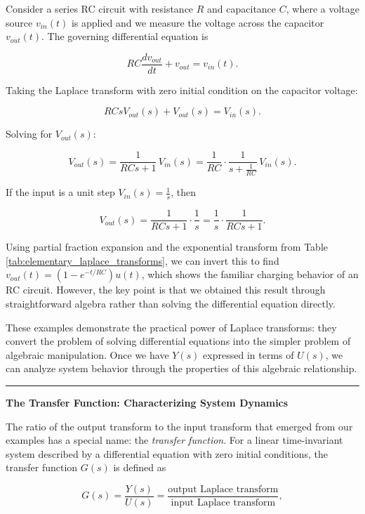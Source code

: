 \begin{example}[RC Circuit]
Consider a series RC circuit with resistance $R$ and capacitance $C$, where a voltage source $v_{in}(t)$ is applied and we measure the voltage across the capacitor $v_{out}(t)$. The governing differential equation is

\[
RC \frac{dv_{out}}{dt} + v_{out} = v_{in}(t).
\]

Taking the Laplace transform with zero initial condition on the capacitor voltage:

\[
RC s V_{out}(s) + V_{out}(s) = V_{in}(s).
\]

Solving for $V_{out}(s)$:

\[
V_{out}(s) = \frac{1}{RCs + 1} \, V_{in}(s) = \frac{1}{RC} \cdot \frac{1}{s + \frac{1}{RC}} \, V_{in}(s).
\]

If the input is a unit step $V_{in}(s) = \frac{1}{s}$, then

\[
V_{out}(s) = \frac{1}{RCs + 1} \cdot \frac{1}{s} = \frac{1}{s} \cdot \frac{1}{RCs + 1}.
\]

Using partial fraction expansion and the exponential transform from Table \ref{tab:elementary_laplace_transforms}, we can invert this to find $v_{out}(t) = (1 - e^{-t/RC}) u(t)$, which shows the familiar charging behavior of an RC circuit. However, the key point is that we obtained this result through straightforward algebra rather than solving the differential equation directly.
\end{example}

These examples demonstrate the practical power of Laplace transforms: they convert the problem of solving differential equations into the simpler problem of algebraic manipulation. Once we have $Y(s)$ expressed in terms of $U(s)$, we can analyze system behavior through the properties of this algebraic relationship.

\vspace{1em}
\hrule
\vspace{0.5em}
\color{UofSCGarnet}\textbf{The Transfer Function: Characterizing System Dynamics}\color{UofSCBlack}
\vspace{0.5em}

The ratio of the output transform to the input transform that emerged from our examples has a special name: the \textit{transfer function}. For a linear time-invariant system described by a differential equation with zero initial conditions, the transfer function $G(s)$ is defined as

\[
G(s) = \frac{Y(s)}{U(s)} = \frac{\text{output Laplace transform}}{\text{input Laplace transform}},
\]


